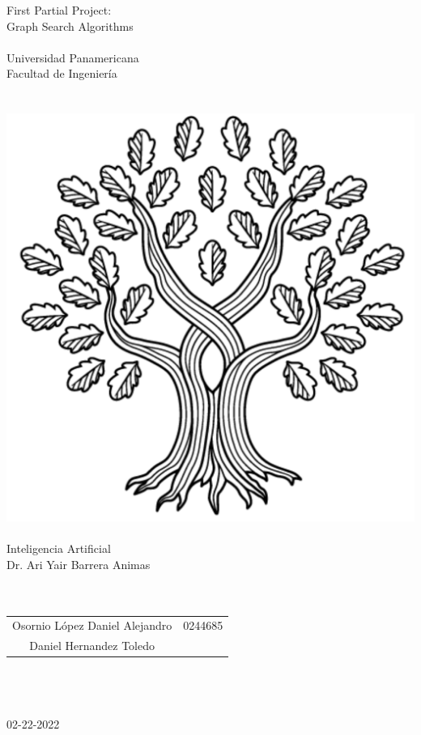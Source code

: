 
\hspace{0pt}
\vfill


\begin{center}
    {\huge First Partial Project:\\Graph Search Algorithms}\\    \quad\\
    {\large Universidad Panamericana}\\
    {\large Facultad de Ingeniería}\\
    \quad\\
    \quad\\
    \includegraphics[scale=0.3]{../img/UP}
    \quad\\
    \quad\\
    Inteligencia Artificial\\
    Dr. Ari Yair Barrera Animas\\
    \quad\\
    \quad\\
    \begin{tabular}{c|c}
        Osornio López Daniel Alejandro & 0244685\\
		Daniel Hernandez Toledo & 
    \end{tabular}\\
    \quad\\
    \quad\\
	02-22-2022
\end{center}

